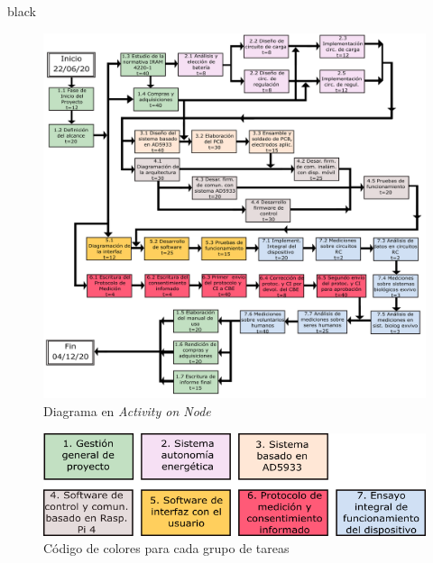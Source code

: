 \documentclass[11pt]{charter}
\begin{document}
\begin{consigna}{black}



\end{consigna}

\begin{figure}[htpb]
\centering 
\includegraphics[width=1.0\textwidth]{./Figuras/AoN.png}
\caption{Diagrama en \textit{Activity on Node}}
\label{fig:AoN}
\end{figure}

\begin{figure}[H]
\centering 
\includegraphics[width=.6\textwidth]{./Figuras/AoN_codigo.png}
\caption{Código de colores para cada grupo de tareas}
\label{fig:AoN_codigo}
\end{figure}
\end{document}
